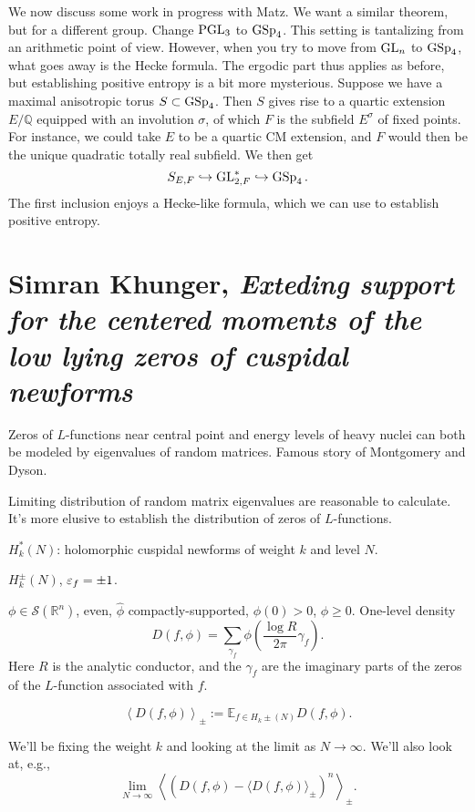 \documentclass[reqno]{amsart} 
\begin{document}
We now discuss some work in progress with Matz.  We want a similar theorem, but for a different group.  Change $\operatorname{PGL}_3$ to $\operatorname{GSp}_4$.  This setting is tantalizing from an arithmetic point of view.  However, when you try to move from $\operatorname{GL}_n$ to $\operatorname{GSp}_4$, what goes away is the Hecke formula.  The ergodic part thus applies as before, but establishing positive entropy is a bit more mysterious.  Suppose we have a maximal anisotropic torus $S \subset \operatorname{GSp}_4$.  Then $S$ gives rise to a quartic extension $E/\mathbb{Q}$ equipped with an involution $\sigma$, of which $F$ is the subfield $E^\sigma $ of fixed points.  For instance, we could take $E$ to be a quartic CM extension, and $F$ would then be the unique quadratic totally real subfield.  We then get
\begin{equation*}
S_{E, F} \hookrightarrow \operatorname{GL}_{2, F }^\ast \hookrightarrow \operatorname{GSp} _4.
\end{equation*}
The first inclusion enjoys a Hecke-like formula, which we can use to establish positive entropy.  


\section{Simran Khunger, \emph{Exteding support for the centered moments of the low lying zeros of cuspidal newforms}}

Zeros of $L$-functions near central point and energy levels of heavy nuclei can both be modeled by eigenvalues of random matrices.  Famous story of Montgomery and Dyson.

Limiting distribution of random matrix eigenvalues are reasonable to calculate.  It's more elusive to establish the distribution of zeros of $L$-functions.

$H_k^*(N)$: holomorphic cuspidal newforms of weight $k$ and level $N$.

$H_k^{\pm} (N)$, $\varepsilon_f = \pm 1$.

$\phi \in \mathcal{S}(\mathbb{R}^n)$, even, $\hat{\phi}$ compactly-supported, $\phi(0) > 0$, $\phi \geq 0$.  One-level density
\begin{equation*}
D(f,\phi) = \sum_{\gamma_f} \phi \left( \frac{\log R}{2 \pi} \gamma_f \right).
\end{equation*}
Here $R$ is the analytic conductor, and the $\gamma_f$ are the imaginary parts of the zeros of the $L$-function associated with $f$.

\begin{definition}
\begin{equation*}
  \left\langle D (f, \phi ) \right\rangle_{\pm }
  :=
  \mathbb{E}_{f \in H_k \pm (N) } D (f, \phi ).
\end{equation*}
\end{definition}
We'll be fixing the weight $k$ and looking at the limit as $N \rightarrow \infty $.  We'll also look at, e.g.,
\begin{equation*}
  \lim_{N \rightarrow \infty } \left\langle
  \left( D (f, \phi ) - \langle D (f, \phi ) \rangle_{\pm } \right)^n \right\rangle_{\pm }.
\end{equation*}
\end{document}

